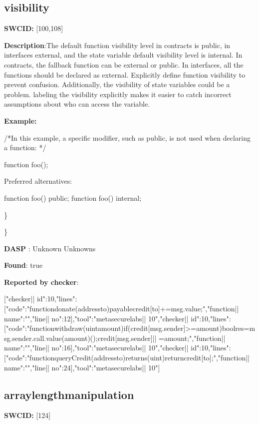\documentclass{article}
\begin{document}
\subsection{visibility} 
\textbf{SWC{\textunderscore}ID:} [100,108]

\textbf{Description}:The default function visibility level in contracts is public, in interfaces {\textendash} external,  and the state variable default visibility level is internal. In contracts, the fallback function can be external or public. In interfaces, all the functions should be declared as external. Explicitly define function visibility to prevent confusion.
Additionally, the visibility of state variables could be a problem. labeling the visibility explicitly makes it easier to catch incorrect assumptions about who can access the variable.


\textbf{Example:} 
\begin{ffcode} 

/*In this example, a specific modifier, such as public, is not used when declaring a function: */ 

function foo();

Preferred alternatives:

function foo() public;
function foo() internal;

\end{ffcode} 
\} 

\} 

\textbf{DASP} : Unknown Unknowns

\textbf{Found}: true

\textbf{Reported by checker}: 
\begin{ffcode} 

[{"checker|\textunderscore| id":10,"lines":[{"code":"functiondonate(addressto)payable{credit[to]+=msg.value;}","function|\textunderscore| name":"","line|\textunderscore| no":12}],"tool":"metasecurelabs|\textendash| 10"},{"checker|\textunderscore| id":10,"lines":[{"code":"functionwithdraw(uintamount){if(credit[msg.sender]>=amount){boolres=msg.sender.call.value(amount)();credit[msg.sender]|\textendash| =amount;}}","function|\textunderscore| name":"","line|\textunderscore| no":16}],"tool":"metasecurelabs|\textendash| 10"},{"checker|\textunderscore| id":10,"lines":[{"code":"functionqueryCredit(addressto)returns(uint){returncredit[to];}","function|\textunderscore| name":"","line|\textunderscore| no":24}],"tool":"metasecurelabs|\textendash| 10"}]
\end{ffcode} 
\subsection{array{\textunderscore}length{\textunderscore}manipulation} 
\textbf{SWC{\textunderscore}ID:} [124]
\end{document}
